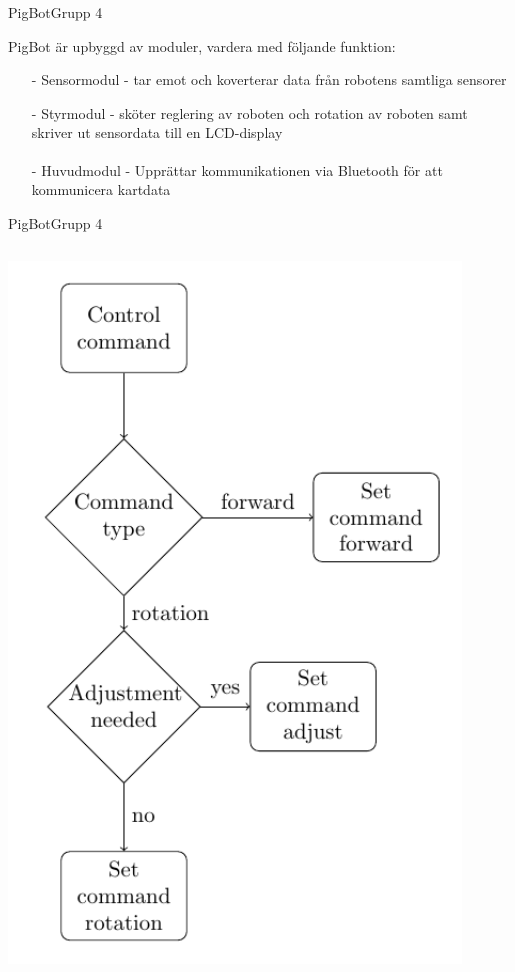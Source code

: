 \begin{frame}[fragile]{PigBot}{Grupp 4}

PigBot är upbyggd av moduler, vardera med följande funktion:
  \begin{itemize}
\pause
    \item[-] Sensormodul - tar emot och koverterar data från robotens samtliga sensorer
\pause
    \item[-] Styrmodul - sköter reglering av roboten och rotation av roboten samt skriver ut sensordata till en LCD-display
\pause
    \item[-] Huvudmodul - Upprättar kommunikationen via Bluetooth\textsuperscript{\circledR} för att kommunicera kartdata
  \end{itemize}
\end{frame}

\begin{frame}{PigBot}{Grupp 4}
	\begin{columns}
		\begin{column}{0.5\textwidth}
			\includegraphics[width=0.9\textwidth]{images/controllerControlFlow.pdf}

\end{column}
\end{columns}
\end{frame}
